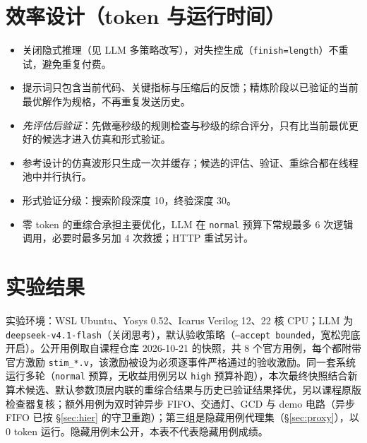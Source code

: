 \documentclass[UTF8,a4paper,zihao=5]{ctexart}
\newcommand{\code}[1]{\texttt{#1}}
\begin{document}
\section{效率设计（token 与运行时间）}\label{sec:eff}
\begin{itemize}
\item 关闭隐式推理（见 LLM 多策略改写），对失控生成（\code{finish=length}）不重试，避免重复付费。
\item 提示词只包含当前代码、关键指标与压缩后的反馈；精炼阶段以已验证的当前最优解作为规格，不再重复发送历史。
\item \emph{先评估后验证}：先做毫秒级的规则检查与秒级的综合评分，只有比当前最优更好的候选才进入仿真和形式验证。
\item 参考设计的仿真波形只生成一次并缓存；候选的评估、验证、重综合都在线程池中并行执行。
\item 形式验证分级：搜索阶段深度 10，终验深度 30。
\item 零 token 的重综合承担主要优化，LLM 在 \code{normal} 预算下常规最多 6 次逻辑调用，必要时最多另加 4 次救援；HTTP 重试另计。
\end{itemize}

\section{实验结果}\label{sec:results}
实验环境：WSL Ubuntu、Yosys 0.52、Icarus Verilog 12、22 核 CPU；LLM 为 \code{deepseek-v4.1-flash}（关闭思考），默认验收策略（\code{--accept bounded}，宽松兜底开启）。公开用例取自课程仓库 2026-10-21 的快照，共 8 个官方用例，每个都附带官方激励 \code{stim\_*.v}，该激励被设为必须逐事件严格通过的验收激励。同一套系统运行多轮（\code{normal} 预算，无收益用例另以 \code{high} 预算补跑），本次最终快照结合新算术候选、默认参数顶层内联的重综合结果与历史已验证结果择优，另以课程原版检查器复核；额外用例为双时钟异步 FIFO、交通灯、GCD 与 demo 电路（异步 FIFO 已按 \S\ref{sec:hier} 的守卫重跑）；第三组是隐藏用例代理集（\S\ref{sec:proxy}），以 0 token 运行。隐藏用例未公开，本表不代表隐藏用例成绩。


\end{document}
